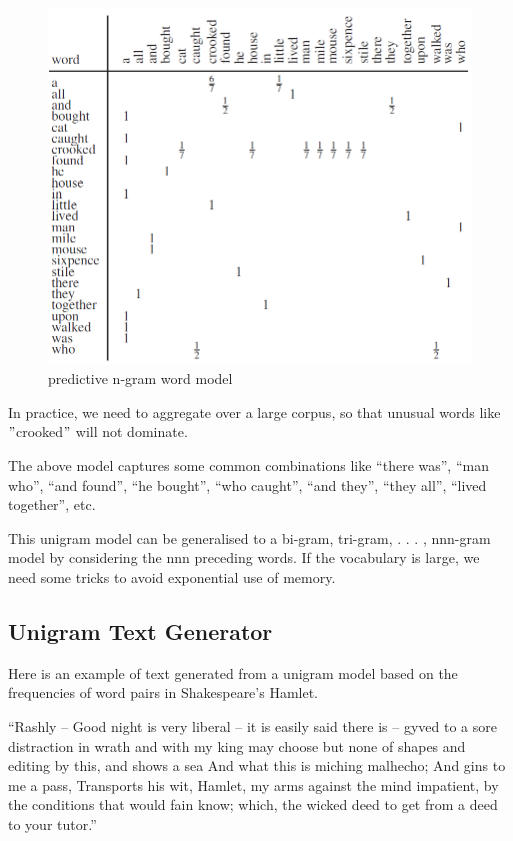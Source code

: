 \documentclass[11pt]{article}
\begin{document}
\begin{figure}[H]
    \centering
    \includegraphics{../out/images/predictive-n-gram-word-model}
    \caption[predictive n-gram word model]{predictive n-gram word model}
    \label{fig:predictive n-gram word model}
\end{figure}

In practice, we need to aggregate over a large corpus, so that unusual words like \("\)crooked\("\) will not dominate.

The above model captures some common combinations like “there was”, “man who”, “and found”, “he bought”, “who caught”, “and they”, “they all”, “lived together”, etc.

This unigram model can be generalised to a bi-gram, tri-gram, . . . , nnn-gram model by considering the nnn preceding words.
If the vocabulary is large, we need some tricks to avoid exponential use of memory.

\subsection{Unigram Text Generator}\label{subsec:unigram-text-generator}
Here is an example of text generated from a unigram model based on the frequencies of word pairs in Shakespeare's Hamlet.

“Rashly – Good night is very liberal – it is easily said there is – gyved to a sore distraction in wrath and with my king may choose but none of shapes and editing by this, and shows a sea And what this is miching malhecho;
And gins to me a pass, Transports his wit, Hamlet, my arms against the mind impatient, by the conditions that would fain know;
which, the wicked deed to get from a deed to your tutor.”
\end{document}
